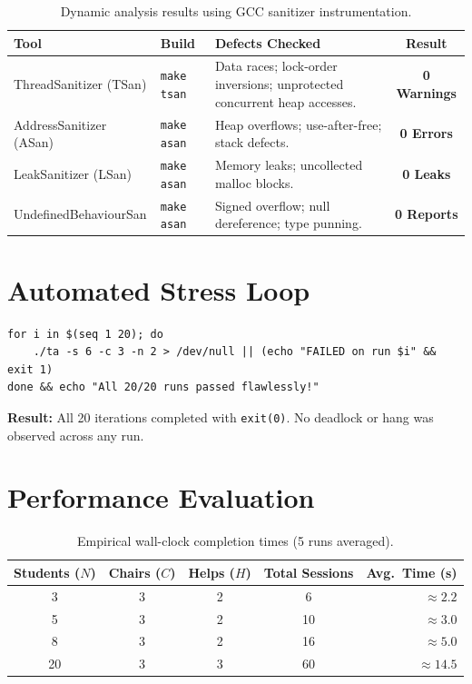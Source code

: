 \documentclass[12pt,a4paper]{report}
\begin{document}
\begin{table}[H]
  \centering
  \caption{Dynamic analysis results using GCC sanitizer instrumentation.}
  \label{tab:sanitizers}
  \begin{tabularx}{\textwidth}{l l X c}
    \toprule
    \textbf{Tool} & \textbf{Build} & \textbf{Defects Checked} & \textbf{Result} \\
    \midrule
    ThreadSanitizer (TSan) & \texttt{make tsan} & Data races; lock-order inversions; unprotected concurrent heap accesses. & \textbf{0 Warnings} \\
    AddressSanitizer (ASan) & \texttt{make asan} & Heap overflows; use-after-free; stack defects. & \textbf{0 Errors} \\
    LeakSanitizer (LSan) & \texttt{make asan} & Memory leaks; uncollected malloc blocks. & \textbf{0 Leaks} \\
    UndefinedBehaviourSan & \texttt{make asan} & Signed overflow; null dereference; type punning. & \textbf{0 Reports} \\
    \bottomrule
  \end{tabularx}
\end{table}

\section{Automated Stress Loop}

\begin{lstlisting}[style=bashstyle,caption={20-run automated stress loop.}]
for i in $(seq 1 20); do
    ./ta -s 6 -c 3 -n 2 > /dev/null || (echo "FAILED on run $i" && exit 1)
done && echo "All 20/20 runs passed flawlessly!"
\end{lstlisting}

\textbf{Result:} All 20 iterations completed with \texttt{exit(0)}. No deadlock or hang was
observed across any run.

\section{Performance Evaluation}

\begin{table}[H]
  \centering
  \caption{Empirical wall-clock completion times (5 runs averaged).}
  \label{tab:perf}
  \begin{tabular}{ccccr}
    \toprule
    \textbf{Students ($N$)} & \textbf{Chairs ($C$)} & \textbf{Helps ($H$)} & \textbf{Total Sessions} & \textbf{Avg.\ Time (s)} \\
    \midrule
    3  & 3 & 2 & 6  & $\approx 2.2$ \\
    5  & 3 & 2 & 10 & $\approx 3.0$ \\
    8  & 3 & 2 & 16 & $\approx 5.0$ \\
    20 & 3 & 3 & 60 & $\approx 14.5$ \\
    \bottomrule
  \end{tabular}
\end{table}
\end{document}
